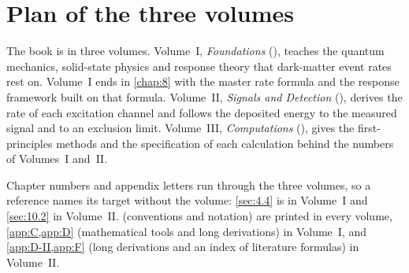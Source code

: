 \chapter*{Plan of the three volumes}
The book is in three volumes. Volume~I, \emph{Foundations} (), teaches the quantum mechanics, solid-state physics and response theory that dark-matter event rates rest on. Volume~I ends in \cref{chap:8} with the master rate formula and the response framework built on that formula. Volume~II, \emph{Signals and Detection} (), derives the rate of each excitation channel and follows the deposited energy to the measured signal and to an exclusion limit. Volume~III, \emph{Computations} (), gives the first-principles methods and the specification of each calculation behind the numbers of Volumes~I and~II.

Chapter numbers and appendix letters run through the three volumes, so a reference names its target without the volume: \cref{sec:4.4} is in Volume~I and \cref{sec:10.2} in Volume~II.  (conventions and notation) are printed in every volume, \cref{app:C,app:D} (mathematical tools and long derivations) in Volume~I, and \cref{app:D-II,app:F} (long derivations and an index of literature formulas) in Volume~II.
